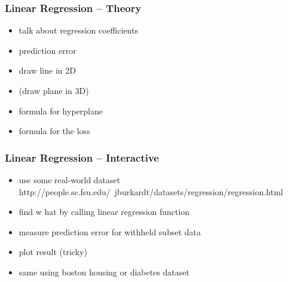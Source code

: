 \begin{frame}
    \frametitle{Linear Regression -- Theory}
    \begin{itemize}
        \item talk about regression coefficients
        \item  prediction error
        \item  draw line in 2D
        \item  (draw plane in 3D)
        \item  formula for hyperplane
        \item  formula for the loss
    \end{itemize}
\end{frame}

\begin{frame}
    \frametitle{Linear Regression -- Interactive}
    \begin{itemize}
        \item  use some real-world dataset
            http://people.sc.fsu.edu/~jburkardt/datasets/regression/regression.html
        \item  find w hat by calling linear regression function
        \item  measure prediction error for withheld subset data
        \item  plot result (tricky)
        \item  same using boston housing or diabetes dataset
    \end{itemize}
\end{frame}

